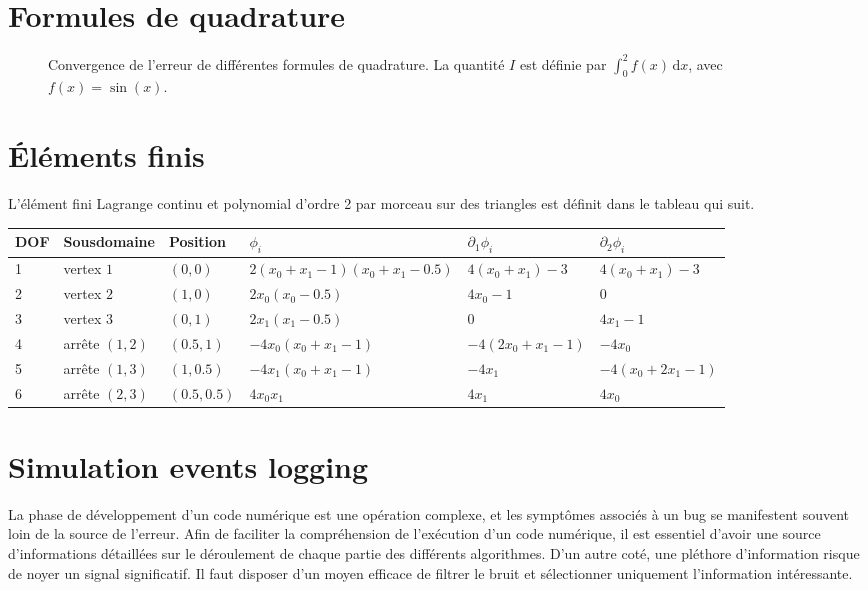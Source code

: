 \section{Formules de quadrature}
\begin{figure}
  \begin{center}
    
    \caption{Convergence de l'erreur de différentes formules de quadrature. La quantité $I$ est définie par $\int_0^2 f(x)\,\mathrm dx$, avec $f(x) = \sin(x)$.}
    \label{fig:quadrature-convergence-1d}
  \end{center}
\end{figure}



\section{Éléments finis}
L'élément fini Lagrange continu et polynomial d'ordre 2 par morceau
sur des triangles est définit dans le tableau qui suit.

\begin{tabularx}{\textwidth}{@{}llllll@{}}
  \toprule
  DOF & Sousdomaine & Position & $\phi_i$ & $\partial_1\phi_i$
& $\partial_2\phi_i$ \\
  \midrule
  1 & vertex $1$     & $(0, 0)$     & $2(x_0 + x_1 - 1)(x_0 + x_1 - 0.5)$  & $4(x_0 + x_1) - 3$  & $4(x_0 + x_1) - 3$ \\
  2 & vertex $2$     & $(1, 0)$     & $2x_0(x_0 - 0.5) $                  & $4x_0 - 1$          & $0$ \\
  3 & vertex $3$     & $(0, 1)$     & $2x_1(x_1 - 0.5) $                  & $0$                 & $4x_1 - 1$ \\
  4 & arrête $(1,2)$ & $(0.5, 1)$   & $-4x_0(x_0 + x_1 - 1) $             & $-4(2x_0+x_1 - 1)$  & $-4x_0$ \\
  5 & arrête $(1,3)$ & $(1, 0.5)$   & $-4x_1(x_0 + x_1 - 1) $             & $-4x_1$             & $-4(x_0 + 2x_1 - 1)$ \\
  6 & arrête $(2,3)$ & $(0.5, 0.5)$ & $4x_0x_1 $                          & $4x_1$              & $4x_0$ \\
  \bottomrule
\end{tabularx}


\section{Simulation events logging}
La phase de développement d'un code numérique est une opération
complexe, et les symptômes associés à un bug se manifestent
souvent loin de la source de l'erreur. Afin de faciliter la
compréhension de l'exécution d'un code numérique, il est essentiel
d'avoir une source d'informations détaillées sur le déroulement de
chaque partie des différents algorithmes. D'un autre coté, une
pléthore d'information risque de noyer un signal significatif. Il faut
disposer d'un moyen efficace de filtrer le bruit et sélectionner
uniquement l'information intéressante.

